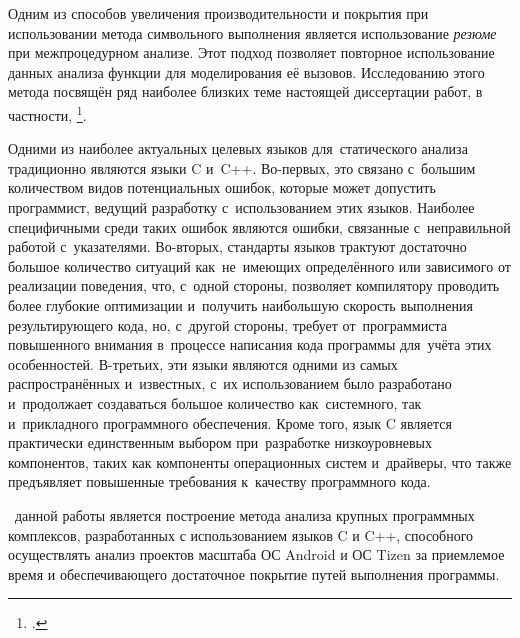 Одним из способов увеличения производительности и покрытия при использовании метода символьного выполнения является использование \textit{резюме} при межпроцедурном анализе. Этот подход позволяет повторное использование данных анализа функции для моделирования её вызовов. Исследованию этого метода посвящён ряд наиболее близких теме настоящей диссертации работ, в частности, \footcite{godefroid-comp,anand-godefroid,may-must}.

Одними из наиболее актуальных целевых языков для~статического анализа традиционно являются языки C и~C++. Во-первых, это связано с~большим количеством видов потенциальных ошибок, которые может допустить программист, ведущий разработку с~использованием этих языков. Наиболее специфичными среди таких ошибок являются ошибки, связанные с~неправильной работой с~указателями. Во-вторых, стандарты языков трактуют достаточно большое количество ситуаций как~не~имеющих определённого или зависимого от реализации поведения, что, с~одной стороны, позволяет компилятору проводить более глубокие оптимизации и~получить наибольшую скорость выполнения результирующего кода, но, с~другой стороны, требует от~программиста повышенного внимания в~процессе написания кода программы для~учёта этих особенностей. В-третьих, эти языки являются одними из самых распространённых и~известных, с~их использованием было разработано и~продолжает создаваться большое количество как~системного, так и~прикладного программного обеспечения. Кроме того, язык C является практически единственным выбором при~разработке низкоуровневых компонентов, таких как компоненты операционных систем и~драйверы, что также предъявляет повышенные требования к~качеству программного кода.

 \aim\ данной работы является построение метода анализа крупных программных комплексов, разработанных с использованием языков C и C++, способного осуществлять анализ проектов масштаба ОС Android и ОС Tizen  за приемлемое время и обеспечивающего достаточное покрытие путей выполнения программы.


